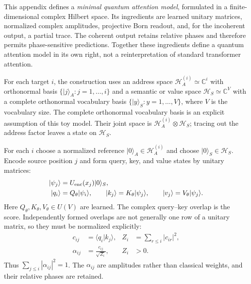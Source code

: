 \documentclass[
  aps,
  reprint,
  superscriptaddress,
  floatfix,
  nofootinbib,
  longbibliography
]{revtex4-2}
\begin{document}
This appendix defines a \emph{minimal quantum attention model}, formulated in
a finite-dimensional complex Hilbert space.  Its ingredients are
learned unitary matrices, normalized complex amplitudes, projective Born
readout, and, for the incoherent output, a partial trace.  The coherent output
retains relative phases and therefore permits phase-sensitive predictions.
Together these ingredients define a quantum attention model in its own right,
not a reinterpretation of standard transformer attention.

For each target $i$, the construction uses an address space
$\mathcal H_A^{(i)}\simeq\mathbb C^i$ with orthonormal basis
$\{|j\rangle_A:j=1,\ldots,i\}$ and a semantic or value space
$\mathcal H_S\simeq\mathbb C^V$ with a complete orthonormal vocabulary basis
$\{|y\rangle_S:y=1,\ldots,V\}$, where $V$ is the vocabulary size.  The
complete orthonormal vocabulary basis is
an explicit assumption of this toy model.  Their joint space is
$\mathcal H_A^{(i)}\otimes\mathcal H_S$; tracing out the address factor leaves
a state on $\mathcal H_S$.

For each $i$ choose a normalized reference $|0\rangle_A\in\mathcal H_A^{(i)}$
and choose $|0\rangle_S\in\mathcal H_S$.  Encode source position $j$ and form
query, key, and value states by unitary matrices:
\begin{equation}
\begin{aligned}
 |\psi_j\rangle&=U_{\rm enc}(x_j)|0\rangle_S,\\
 |q_i\rangle&=Q_\theta|\psi_i\rangle,\qquad
 |k_j\rangle=K_\theta|\psi_j\rangle,\qquad
 |v_j\rangle=V_\theta|\psi_j\rangle .
\end{aligned}
\label{eq:mqa-encoding}
\end{equation}
Here $Q_\theta,K_\theta,V_\theta\in U(V)$ are learned.  The complex
query--key overlap is the score.  Independently formed overlaps are not
generally one row of a unitary matrix, so they must be normalized explicitly:
\begin{equation}
\begin{aligned}
 c_{ij}&=\langle q_i|k_j\rangle,
 &Z_i&=\sum_{r\leq i}|c_{ir}|^2,\\
 \alpha_{ij}&=\frac{c_{ij}}{\sqrt{Z_i}},
 &Z_i&>0 .
\end{aligned}
\label{eq:mqa-scores}
\end{equation}
Thus $\sum_{j\leq i}|\alpha_{ij}|^2=1$.  The $\alpha_{ij}$ are amplitudes
rather than classical weights, and their relative phases are retained.
\end{document}
